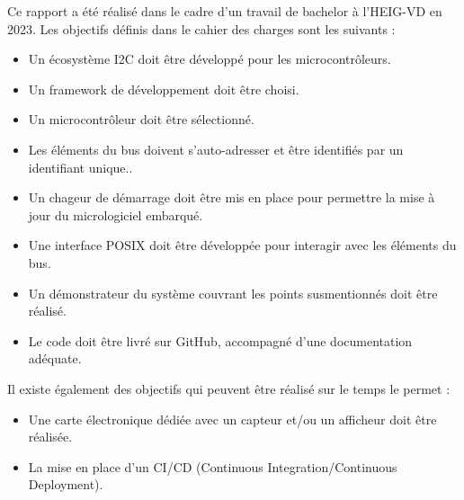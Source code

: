 Ce rapport a été réalisé dans le cadre d'un travail de bachelor à l'HEIG-VD en 2023.
Les objectifs définis dans le cahier des charges sont les suivants :

\begin{itemize}
    \item Un écosystème I2C doit être développé pour les microcontrôleurs.
    \item Un framework de développement doit être choisi.
    \item Un microcontrôleur doit être sélectionné.
    \item Les éléments du bus doivent s'auto-adresser et être identifiés par un identifiant unique..
    \item Un chageur de démarrage doit être mis en place pour permettre la mise à jour du micrologiciel embarqué.
    \item Une interface POSIX doit être développée pour interagir avec les éléments du bus.
    \item Un démonstrateur du système couvrant les points susmentionnés doit être réalisé.
    \item Le code doit être livré sur GitHub, accompagné d'une documentation adéquate.
\end{itemize}

Il existe également des objectifs qui peuvent être réalisé sur le temps le permet :

\begin{itemize}
    \item Une carte électronique dédiée avec un capteur et/ou un afficheur doit être réalisée.
    \item La mise en place d'un CI/CD (Continuous Integration/Continuous Deployment).
\end{itemize}

